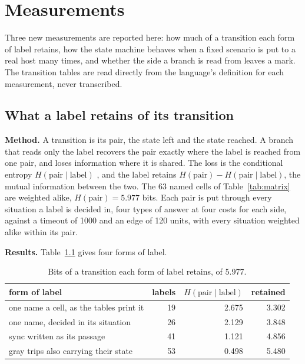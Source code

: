 \chapter{Measurements}
\label{ch:measured}

Three new measurements are reported here: how much of a transition each form of label retains, how
the state machine behaves when a fixed scenario is put to a real host many times, and whether the
side a branch is read from leaves a mark. The transition tables are read directly from the
language's definition for each measurement, never transcribed.

\section{What a label retains of its transition}
\label{sec:labels}

\textbf{Method.} A transition is its pair, the state left and the state reached. A branch that
reads only the label recovers the pair exactly where the label is reached from one pair, and loses
information where it is shared. The loss is the conditional entropy
\(H(\text{pair} \mid \text{label})\) \cite{src:Shannon}, and the label retains
\(H(\text{pair}) - H(\text{pair} \mid \text{label})\), the mutual information between the two.
The 63 named cells of Table~\ref{tab:matrix} are weighted alike, \(H(\text{pair}) = 5.977\) bits.
Each pair is put through every situation a label is decided in, four types of answer at four
costs for each side, against a timeout of 1000 and an edge of 120 units, with every situation
weighted alike within its pair.

\textbf{Results.} Table~\ref{tab:labelbits} gives four forms of label.

\begin{table}[h]
\centering
\small
\begin{tabular}{@{}l r r r@{}}
\toprule
form of label & labels & \(H(\text{pair}\mid\text{label})\) & retained \\
\midrule
one name a cell, as the tables print it & 19 & 2.675 & 3.302 \\
one name, decided in its situation & 26 & 2.129 & 3.848 \\
sync written as its passage & 41 & 1.121 & 4.856 \\
gray trips also carrying their state & 53 & 0.498 & 5.480 \\
\bottomrule
\end{tabular}
\caption{Bits of a transition each form of label retains, of 5.977.}
\label{tab:labelbits}
\end{table}

